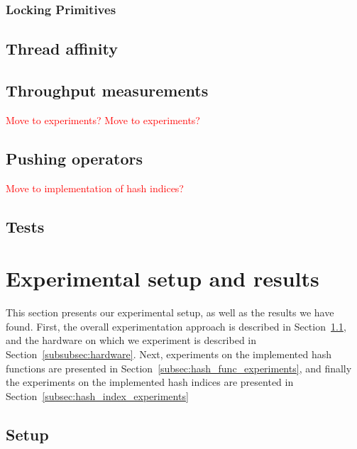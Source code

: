 \documentclass[11pt]{article} %
\begin{document}
\subsubsection{Locking Primitives}
\label{subsubsec:implementation_locking_primitives}

\subsection{Thread affinity}
\label{subsec:implementation_thread_affinity}
\subsection{Throughput measurements}
\textcolor{red}{Move to experiments?}
\label{subsec:implementation_throughput_measurements}
\textcolor{red}{Move to experiments?}
\subsection{Pushing operators}
\label{subsec:implementation_pushing_operators}
\textcolor{red}{Move to implementation of hash indices?}
\subsection{Tests}
\label{subsec:implementation_tests}
\newpage

\section{Experimental setup and results}
This section presents our experimental setup, as well as the results we have found. First, the overall experimentation approach is described in Section~\ref{subsec:experiment_setup}, and the hardware on which we experiment is described in Section~\ref{subsubsec:hardware}. Next, experiments on the implemented hash functions are presented in Section~\ref{subsec:hash_func_experiments}, and finally the experiments on the implemented hash indices are presented in Section~\ref{subsec:hash_index_experiments}

\subsection{Setup}
\label{subsec:experiment_setup}
\end{document}
